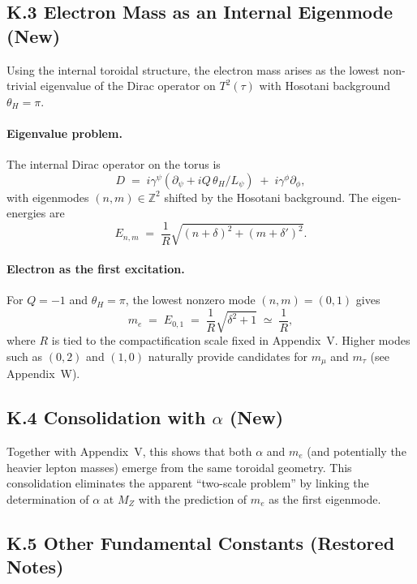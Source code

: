 \subsection*{K.3 Electron Mass as an Internal Eigenmode (New)}
Using the internal toroidal structure, the electron mass arises as the lowest non-trivial eigenvalue of the Dirac operator on $T^2(\tau)$ with Hosotani background $\theta_H=\pi$.

\paragraph{Eigenvalue problem.}
The internal Dirac operator on the torus is
\begin{equation}
D \;=\; i\gamma^\psi \!\left(\partial_\psi + i Q\, \theta_H/L_\psi\right) \;+\; i\gamma^\phi \partial_\phi,
\end{equation}
with eigenmodes $(n,m)\in\mathbb{Z}^2$ shifted by the Hosotani background. The eigen-energies are
\begin{equation}
E_{n,m} \;=\; \frac{1}{R}\sqrt{(n+\delta)^2 + (m+\delta')^2}.
\end{equation}

\paragraph{Electron as the first excitation.}
For $Q=-1$ and $\theta_H=\pi$, the lowest nonzero mode $(n,m)=(0,1)$ gives
\begin{equation}
m_e \;=\; E_{0,1} \;=\; \frac{1}{R}\sqrt{\delta^2+1} \;\simeq\; \frac{1}{R},
\end{equation}
where $R$ is tied to the compactification scale fixed in Appendix~V. 
Higher modes such as $(0,2)$ and $(1,0)$ naturally provide candidates for $m_\mu$ and $m_\tau$ (see Appendix~W).

\subsection*{K.4 Consolidation with $\alpha$ (New)}
Together with Appendix~V, this shows that both $\alpha$ and $m_e$ (and potentially the heavier lepton masses) emerge from the same toroidal geometry.  
This consolidation eliminates the apparent ``two-scale problem'' by linking the determination of $\alpha$ at $M_Z$ with the prediction of $m_e$ as the first eigenmode.

\subsection*{K.5 Other Fundamental Constants (Restored Notes)}
